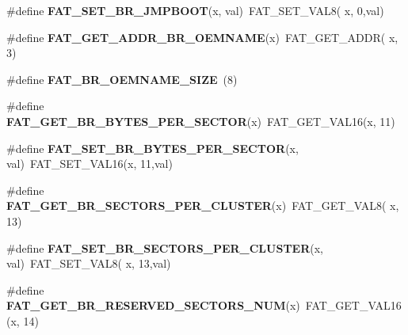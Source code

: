 \begin{DoxyCompactItemize}
\#define {\bfseries F\+A\+T\+\_\+\+S\+E\+T\+\_\+\+B\+R\+\_\+\+J\+M\+P\+B\+O\+OT}(x,  val)~F\+A\+T\+\_\+\+S\+E\+T\+\_\+\+V\+A\+L8( x,  0,val)
\item 
\mbox{\label{group__libfs__dosfs_gaa3019323df2c8ea4230d229762a80d2b}} 
\#define {\bfseries F\+A\+T\+\_\+\+G\+E\+T\+\_\+\+A\+D\+D\+R\+\_\+\+B\+R\+\_\+\+O\+E\+M\+N\+A\+ME}(x)~F\+A\+T\+\_\+\+G\+E\+T\+\_\+\+A\+D\+DR( x,  3)
\item 
\mbox{\label{group__libfs__dosfs_gaa1ec1227ee12f116834429b3e8fd8180}} 
\#define {\bfseries F\+A\+T\+\_\+\+B\+R\+\_\+\+O\+E\+M\+N\+A\+M\+E\+\_\+\+S\+I\+ZE}~(8)
\item 
\mbox{\label{group__libfs__dosfs_ga23eb994887d55a14418f2d47abdce90f}} 
\#define {\bfseries F\+A\+T\+\_\+\+G\+E\+T\+\_\+\+B\+R\+\_\+\+B\+Y\+T\+E\+S\+\_\+\+P\+E\+R\+\_\+\+S\+E\+C\+T\+OR}(x)~F\+A\+T\+\_\+\+G\+E\+T\+\_\+\+V\+A\+L16(x, 11)
\item 
\mbox{\label{group__libfs__dosfs_ga359d43cd36ae0c344274daa7e3c8928a}} 
\#define {\bfseries F\+A\+T\+\_\+\+S\+E\+T\+\_\+\+B\+R\+\_\+\+B\+Y\+T\+E\+S\+\_\+\+P\+E\+R\+\_\+\+S\+E\+C\+T\+OR}(x,  val)~F\+A\+T\+\_\+\+S\+E\+T\+\_\+\+V\+A\+L16(x, 11,val)
\item 
\mbox{\label{group__libfs__dosfs_ga55e371424388870b430d279793fd1455}} 
\#define {\bfseries F\+A\+T\+\_\+\+G\+E\+T\+\_\+\+B\+R\+\_\+\+S\+E\+C\+T\+O\+R\+S\+\_\+\+P\+E\+R\+\_\+\+C\+L\+U\+S\+T\+ER}(x)~F\+A\+T\+\_\+\+G\+E\+T\+\_\+\+V\+A\+L8( x, 13)
\item 
\mbox{\label{group__libfs__dosfs_ga8e4c02ee9c3a5a74a0bba427daedbcd9}} 
\#define {\bfseries F\+A\+T\+\_\+\+S\+E\+T\+\_\+\+B\+R\+\_\+\+S\+E\+C\+T\+O\+R\+S\+\_\+\+P\+E\+R\+\_\+\+C\+L\+U\+S\+T\+ER}(x,  val)~F\+A\+T\+\_\+\+S\+E\+T\+\_\+\+V\+A\+L8( x, 13,val)
\item 
\mbox{\label{group__libfs__dosfs_ga468d1ef50b317cb345ee7729cb8164a5}} 
\#define {\bfseries F\+A\+T\+\_\+\+G\+E\+T\+\_\+\+B\+R\+\_\+\+R\+E\+S\+E\+R\+V\+E\+D\+\_\+\+S\+E\+C\+T\+O\+R\+S\+\_\+\+N\+UM}(x)~F\+A\+T\+\_\+\+G\+E\+T\+\_\+\+V\+A\+L16(x, 14)
\item 
\mbox{\label{group__libfs__dosfs_gab24a360049f4860e12b779885bf6a009}} 

\end{DoxyCompactItemize}
